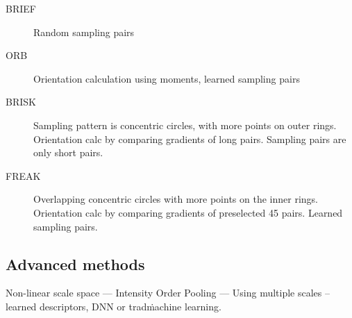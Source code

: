 \begin{description}
    \item [BRIEF] Random sampling pairs
    \item [ORB] Orientation calculation using moments, learned sampling pairs
    \item [BRISK] Sampling pattern is concentric circles, with more points on
        outer rings. Orientation calc by comparing gradients of long pairs.
        Sampling pairs are only short pairs.
    \item [FREAK] Overlapping concentric circles with more points on the inner
        rings. Orientation calc by comparing gradients of preselected 45 pairs.
        Learned sampling pairs.
\end{description}

\subsection{Advanced methods}
Non-linear scale space --- Intensity Order Pooling --- Using multiple scales --
learned descriptors, DNN or trad\. machine learning.

























